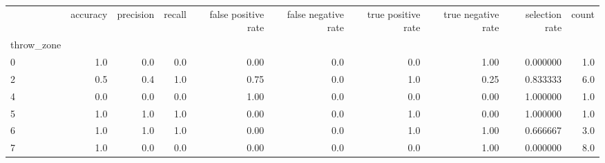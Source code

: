 \begin{tabular}{lrrrrrrrrr}
\toprule
{} &  accuracy &  precision &  recall &  false positive rate &  false negative rate &  true positive rate &  true negative rate &  selection rate &  count \\
throw\_zone &           &            &         &                      &                      &                     &                     &                 &        \\
\midrule
0          &       1.0 &        0.0 &     0.0 &                 0.00 &                  0.0 &                 0.0 &                1.00 &        0.000000 &    1.0 \\
2          &       0.5 &        0.4 &     1.0 &                 0.75 &                  0.0 &                 1.0 &                0.25 &        0.833333 &    6.0 \\
4          &       0.0 &        0.0 &     0.0 &                 1.00 &                  0.0 &                 0.0 &                0.00 &        1.000000 &    1.0 \\
5          &       1.0 &        1.0 &     1.0 &                 0.00 &                  0.0 &                 1.0 &                0.00 &        1.000000 &    1.0 \\
6          &       1.0 &        1.0 &     1.0 &                 0.00 &                  0.0 &                 1.0 &                1.00 &        0.666667 &    3.0 \\
7          &       1.0 &        0.0 &     0.0 &                 0.00 &                  0.0 &                 0.0 &                1.00 &        0.000000 &    8.0 \\
\bottomrule
\end{tabular}
